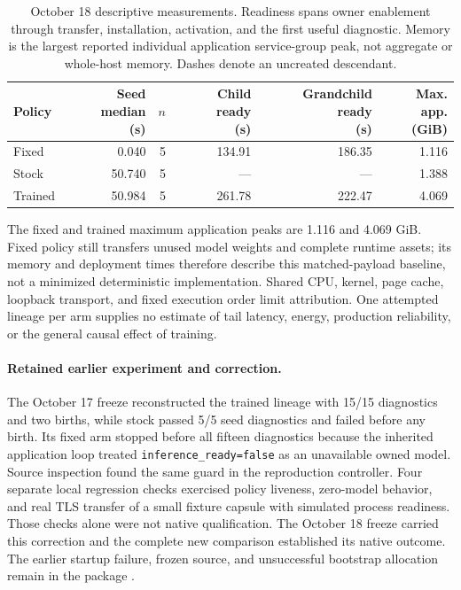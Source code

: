 \documentclass[11pt,letterpaper]{article}
\begin{document}
\begin{table}[htbp]
\centering\small
\caption{October 18 descriptive measurements. Readiness spans owner enablement
through transfer, installation, activation, and the first useful diagnostic.
Memory is the largest reported individual application service-group peak,
not aggregate or whole-host memory. Dashes denote an uncreated descendant.}
\label{tab:nativetiming}
\begin{tabular}{@{}lrrrrr@{}}
\toprule
Policy & \shortstack{Seed median\\(s)} & $n$ & \shortstack{Child ready\\(s)} &
\shortstack{Grandchild ready\\(s)} & \shortstack{Max. app.\\(GiB)}\\
\midrule
Fixed & 0.040 & 5 & 134.91 & 186.35 & 1.116\\
Stock & 50.740 & 5 & --- & --- & 1.388\\
Trained & 50.984 & 5 & 261.78 & 222.47 & 4.069\\
\bottomrule
\end{tabular}
\end{table}

The fixed and trained maximum application peaks are 1.116 and 4.069 GiB.
Fixed policy still transfers unused model weights and complete runtime assets;
its memory and deployment times therefore describe this matched-payload
baseline, not a minimized deterministic implementation. Shared CPU, kernel,
page cache, loopback transport, and fixed execution order limit attribution.
One attempted lineage per arm supplies no estimate of tail latency, energy,
production reliability, or the general causal effect of training.

\paragraph{Retained earlier experiment and correction.}
The October 17 freeze reconstructed the trained lineage with 15/15 diagnostics
and two births, while stock passed 5/5 seed diagnostics and failed before any
birth. Its fixed arm stopped before all fifteen diagnostics because the
inherited application loop treated \texttt{inference\_ready=false} as an
unavailable owned model. Source inspection found the same guard in the
reproduction controller. Four separate local regression checks exercised
policy liveness, zero-model behavior, and real TLS transfer of a small fixture
capsule with simulated process readiness. Those checks alone were not native
qualification. The October 18 freeze carried this correction and the complete
new comparison established its native outcome. The earlier startup failure,
frozen source, and unsuccessful bootstrap allocation remain in the package
\cite{controls,correctedcontrols,repropackage}.
\end{document}
